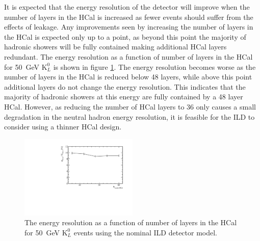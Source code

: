 It is expected that the energy resolution of the detector will improve when the number of layers in the HCal is increased as fewer events should suffer from the effects of leakage.  Any improvements seen by increasing the number of layers in the HCal is expected only up to a point, as beyond this point the majority of hadronic showers will be fully contained making additional HCal layers redundant.  The energy resolution as a function of number of layers in the HCal for 50~GeV $\text{K}^{0}_{L}$ is shown in figure \ref{fig:hcalnfixedlayerser}.  The energy resolution becomes worse as the number of layers in the HCal is reduced below 48 layers, while above this point additional layers do not change the energy resolution.  This indicates that the majority of hadronic showers at this energy are fully contained by a 48 layer HCal.  However, as reducing the number of HCal layers to 36 only causes a small degradation in the neutral hadron energy resolution, it is feasible for the ILD to consider using a thinner HCal design.  

\begin{figure}[h!]
\centering
\includegraphics[width=0.5\textwidth]{OptimisationStudies/Plots/EnergyResolution/ER_vs_HCalNFixedLayers_50GeVKaon0L.pdf}
\caption[The energy resolution as a function of number of layers in the HCal for 50~GeV $\text{K}^{0}_{L}$ events using the nominal ILD detector model.]{The energy resolution as a function of number of layers in the HCal for 50~GeV $\text{K}^{0}_{L}$ events using the nominal ILD detector model.}
\label{fig:hcalnfixedlayerser}
\end{figure}


